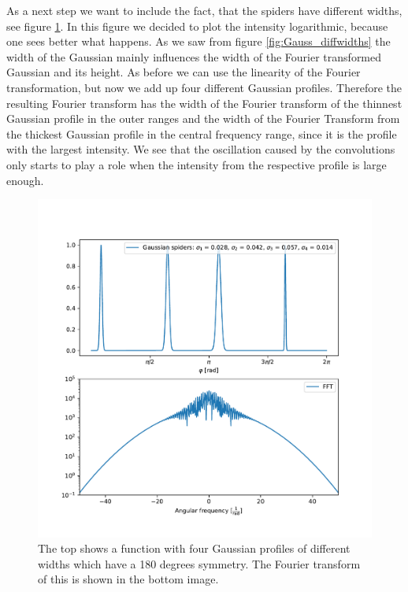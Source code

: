 As a next step we want to include the fact, that the spiders have different widths, see figure \ref{fig:Gaussian_fourdiffspyders}. In this figure we decided to plot the intensity logarithmic, because one sees better what happens. As we saw from figure \ref{fig:Gauss_diffwidths} the width of the Gaussian mainly influences the width of the Fourier transformed Gaussian and its height. As before we can use the linearity of the Fourier transformation, but now we add up four different Gaussian profiles. Therefore the resulting Fourier transform has the width of the Fourier transform of the thinnest Gaussian profile in the outer ranges and the width of the Fourier Transform from the thickest Gaussian profile in the central frequency range, since it is the profile with the largest intensity. We see that the oscillation caused by the convolutions only starts to play a role when the intensity from the respective profile is large enough. 
\begin{figure}[H]
	\centering
		\includegraphics[width=1.0\textwidth]{pics/Gaussian_fourdiffspyders.pdf}
		\caption{The top shows a function with four Gaussian profiles of different widths which have a 180 degrees symmetry. The Fourier transform of this is shown in the bottom image.}
		\label{fig:Gaussian_fourdiffspyders}
\end{figure} 
